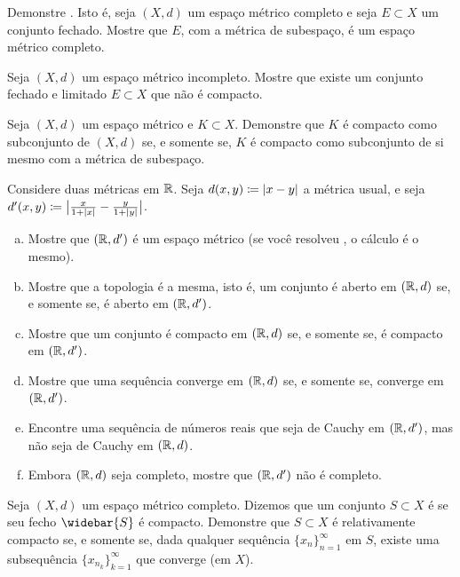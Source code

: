 \begin{exercise} \label{exercise:closedcomplete}
Demonstre . Isto é,
seja $(X,d)$ um espaço métrico completo e seja $E \subset X$ um conjunto fechado.
Mostre que $E$, com a métrica de subespaço, é um espaço métrico completo.
\end{exercise}

\begin{exercise}
Seja $(X,d)$ um espaço métrico incompleto. Mostre que existe um
conjunto fechado e limitado $E \subset X$ que não é compacto.
\end{exercise}

\begin{exercise}
Seja $(X,d)$ um espaço métrico e $K \subset X$.
Demonstre que $K$ é compacto como subconjunto de $(X,d)$ se, e somente se, $K$ é
compacto como subconjunto de si mesmo com a métrica de subespaço.
\end{exercise}

\begin{exercise} \label{exercise:cauchydepndsonmetric}
Considere duas métricas em ${\mathbb{R}}$.
Seja $d(x,y) \coloneqq \lvert {x-y} \rvert$ a métrica usual,
e seja
$d'(x,y) \coloneqq
\bigl\lvert { \frac{x}{1+\lvert {x} \rvert} - \frac{y}{1+\lvert {y} \rvert} } \bigr\rvert$.
\begin{enumerate}[a)]
\item
Mostre que $({\mathbb{R}},d')$ é um espaço métrico (se você resolveu
, o cálculo é o mesmo).
\item
Mostre que a topologia é a mesma, isto é, um conjunto é aberto em
$({\mathbb{R}},d)$ se, e somente se, é aberto em $({\mathbb{R}},d')$.
\item
Mostre que um conjunto é compacto em
$({\mathbb{R}},d)$ se, e somente se, é compacto em $({\mathbb{R}},d')$.
\item
Mostre que uma sequência converge em $({\mathbb{R}},d)$ se, e somente se,
converge em $({\mathbb{R}},d')$.
\item
Encontre uma sequência de números reais que seja de Cauchy
em $({\mathbb{R}},d')$, mas não seja de Cauchy em $({\mathbb{R}},d)$.
\item
Embora $({\mathbb{R}},d)$ seja completo, mostre que $({\mathbb{R}},d')$ não é completo.
\end{enumerate}
\end{exercise}

\begin{exercise} \label{exercise:relativelycompactseq}
\pagebreak[2]
Seja $(X,d)$ um espaço métrico completo.
Dizemos que um conjunto $S \subset X$ é \emph{}
se seu fecho $\widebar{S}$ é compacto.
Demonstre que $S \subset X$ é relativamente compacto se, e somente se,
dada qualquer sequência $\{ x_n \}_{n=1}^\infty$ em $S$, existe uma subsequência
$\{ x_{n_k} \}_{k=1}^\infty$ que converge (em $X$).
\end{exercise}

